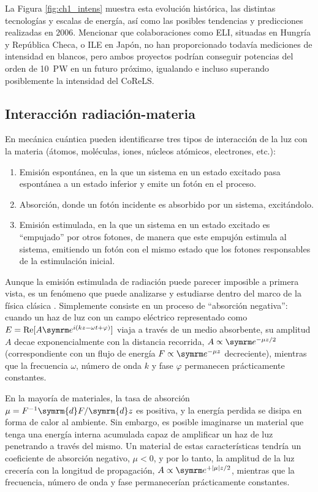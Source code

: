 La Figura \ref{fig:ch1_intens} muestra esta evolución histórica, las distintas tecnologías y escalas de energía, así como las posibles tendencias y predicciones \autocite{Mourou2006} realizadas en $2006$. Mencionar que colaboraciones como ELI, situadas en Hungría y República Checa, o ILE en Japón, no han proporcionado todavía mediciones de intensidad en blancos, pero ambos proyectos podrían conseguir potencias del orden de \qty{10}{PW} en un futuro próximo, igualando e incluso superando posiblemente la intensidad del CoReLS. 

\subsection{Interacción radiación-materia}\label{sec:1.1.1}
En mecánica cuántica pueden identificarse tres tipos de interacción de la luz con la materia (átomos, moléculas, iones, núcleos atómicos, electrones, etc.): 
\begin{enumerate}[label=(\roman*)]

    \item Emisión espontánea, en la que un sistema en un estado excitado pasa espontánea a un estado inferior y emite un fotón en el proceso.
    \item Absorción, donde un fotón incidente es absorbido por un sistema, excitándolo.
    \item Emisión estimulada, en la que un sistema en un estado excitado es \enquote{empujado} por otros fotones, de manera que este empujón estimula al sistema, emitiendo un fotón con el mismo estado que los fotones responsables de la estimulación inicial.

\end{enumerate}
Aunque la emisión estimulada de radiación puede parecer imposible a primera vista, es un fenómeno que puede analizarse y estudiarse dentro del marco de la física clásica \autocite{Thorne2017}. Simplemente consiste en un proceso de \enquote{absorción negativa}: cuando un haz de luz con un campo eléctrico representado como $E = \RE [A\eu^{i(kz - \omega t + \varphi)}]$ viaja a través de un medio absorbente, su amplitud $A$ decae exponencialmente con la distancia recorrida, $A \propto \eu^{-\mu z/2}$ (correspondiente con un flujo de energía $F \propto \eu^{-\mu z}$ decreciente), mientras que la frecuencia $\omega$, número de onda $k$ y fase $\varphi$ permanecen prácticamente constantes.

En la mayoría de materiales, la tasa de absorción $\mu = F^{-1} \symrm{d}F/\symrm{d}z$ es positiva, y la energía perdida se disipa en forma de calor al ambiente. Sin embargo, es posible imaginarse un material que tenga una energía interna acumulada capaz de amplificar un haz de luz penetrando a través del mismo. Un material de estas características tendría un coeficiente de absorción negativo, $\mu < 0$, y por lo tanto, la amplitud de la luz crecería con la longitud de propagación, $A \propto \eu^{+|\mu|z/2}$, mientras que la frecuencia, número de onda y fase permanecerían prácticamente constantes.

